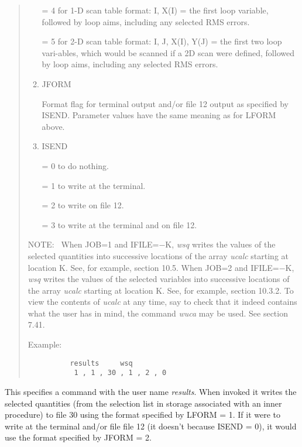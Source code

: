 \begin{quotation}
\begin{enumerate}
			  = 4 for 1-D scan table format: I, X(I) = the first loop variable,
			  followed by \hspace*{1em}loop aims, including any selected  RMS errors.


			  = 5 for 2-D scan table format: I, J, X(I), Y(J) = the first two
			  loop vari-\hspace*{1em}ables, which would be scanned if a 2D scan
			  were defined, followed by loop \hspace*{1em}aims, including any selected  RMS errors.

       \item  JFORM

	          Format flag for terminal output and/or file 12 output as
			  specified by ISEND.  Parameter values have the same meaning as for LFORM above.

       \item  ISEND

              = 0 to do nothing.

              = 1 to write at the terminal.

              = 2 to write on file 12.

              = 3 to write at the terminal and on file 12.
\end{enumerate}

\noindent NOTE: \ When JOB=1 and IFILE=$-$K, {\em wsq} writes the values of the
selected quantities into successive locations of the array {\em ucalc}
starting at location K.  See, for example, section 10.5.  When JOB=2 and
IFILE=$-$K, {\em wsq} writes the values of the selected variables into
successive locations of the array {\em ucalc} starting at location K.
See, for example, section 10.3.2.  To view the contents of {\em ucalc} at
any time, say to check that it indeed contains what the user has in mind,
the command {\em wuca} may be used.  See section 7.41.

\vspace{5mm}
\noindent Example:
\begin{verbatim}
          results     wsq
           1 , 1 , 30 , 1 , 2 , 0
\end{verbatim}
\end{quotation}

This specifies a command with the user name {\em results}.  When invoked it writes the selected quantities (from the selection list in storage associated with an inner procedure) to file 30 using the format specified by LFORM = 1.  If it were to write at the terminal and/or file file 12 (it doesn't because ISEND = 0), it would use the format specified by JFORM = 2.

